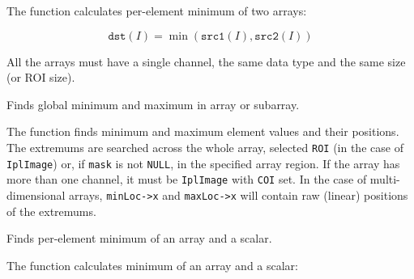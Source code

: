 \begin{description}
\end{description}


The function calculates per-element minimum of two arrays:

\[
\texttt{dst}(I)=\min(\texttt{src1}(I),\texttt{src2}(I))
\]

All the arrays must have a single channel, the same data type and the same size (or ROI size).


Finds global minimum and maximum in array or subarray.


\begin{description}
\end{description}

The function finds minimum and maximum element values
and their positions. The extremums are searched across the whole array,
selected \texttt{ROI} (in the case of \texttt{IplImage}) or, if \texttt{mask}
is not \texttt{NULL}, in the specified array region. If the array has
more than one channel, it must be \texttt{IplImage} with \texttt{COI}
set. In the case of multi-dimensional arrays, \texttt{minLoc->x} and \texttt{maxLoc->x}
will contain raw (linear) positions of the extremums.

Finds per-element minimum of an array and a scalar.


\begin{description}
\end{description}

The function calculates minimum of an array and a scalar:

